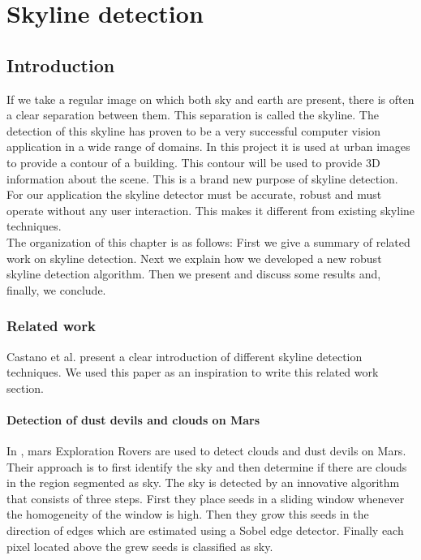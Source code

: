 

\section{Skyline detection}
 \subsection{Introduction}
If we take a regular image on which both sky and earth are present, there
is often a clear separation between them. This separation is called the
skyline. %
The detection of this skyline has proven to be a very successful computer vision
application in a wide range of domains. In this project it is used at urban
images to provide a contour of a building.  This contour will be used to
provide 3D information about the scene. This is a brand new purpose of skyline
detection.\\
For our application the skyline detector must be accurate, robust and must
operate without any user interaction. This makes it different from existing
skyline techniques.\\
The organization of this chapter is as follows:  First we give a summary of
related work on skyline detection.  Next we explain how we developed a new
robust skyline detection algorithm.  Then we present and discuss some results
and, finally, we conclude.

\subsubsection{Related work}
Castano et al. \cite{Dust} present a clear introduction of different skyline
detection techniques. We used this paper as an inspiration to write this related work
section.


\paragraph{Detection of dust devils and clouds on Mars}
In \cite{Dust}, mars Exploration Rovers are used to detect clouds and dust devils on Mars.
Their approach is to first identify the sky and then determine if there are
clouds in the region segmented as sky. The sky is detected by an innovative
algorithm that consists of three steps.  First they place seeds in a sliding
window whenever the homogeneity of the window is high. Then they grow this seeds
in the direction of edges which are estimated using a Sobel edge detector.
Finally each pixel located above the grew seeds is classified as sky.\\

